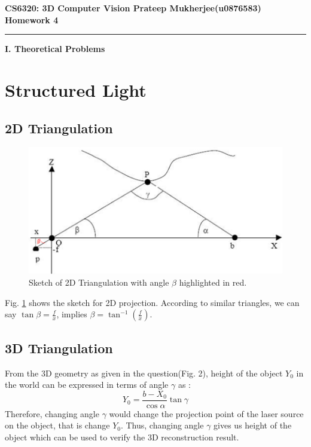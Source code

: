 \documentclass[11pt]{article}
\begin{document}
\thispagestyle{empty}
{\large{\bf CS6320: 3D Computer Vision \hfill Prateep Mukherjee(u0876583)}}\\

{\LARGE{\bf Homework 4}}
\vspace{0.2\baselineskip}
\hrule


{\huge{\bf I. Theoretical Problems}}
    \vspace{-10pt}
    
 \section{Structured Light}   
   \vspace{-10pt}

\subsection{\textbf{2D Triangulation}}
\vspace{-10pt}

\begin{figure}[!hbt]
\centering
\includegraphics[width=0.5\linewidth]{../im1.png}
\caption{Sketch of 2D Triangulation with angle $\beta$ highlighted in red.}
\label{fig1}
\end{figure}

Fig. \ref{fig1} shows the sketch for 2D projection. According to similar triangles, we can say $\tan{\beta} = \frac{f}{x}$, implies $\beta = \tan^{-1}(\frac{f}{x})$.

\subsection{\textbf{3D Triangulation}}
\vspace{-10pt}

From the 3D geometry as given in the question(Fig. 2), height of the object $Y_0$ in the world can be expressed in terms of angle $\gamma$ as :
\vspace{-5pt}
$$Y_0 = \frac{b-X_0}{\cos \alpha} \tan \gamma$$ 
Therefore, changing angle $\gamma$ would change the projection point of the laser source on the object, that is change $Y_0$. Thus, changing angle $\gamma$ gives us height of the object which can be used to verify the 3D reconstruction result. 
\end{document}
